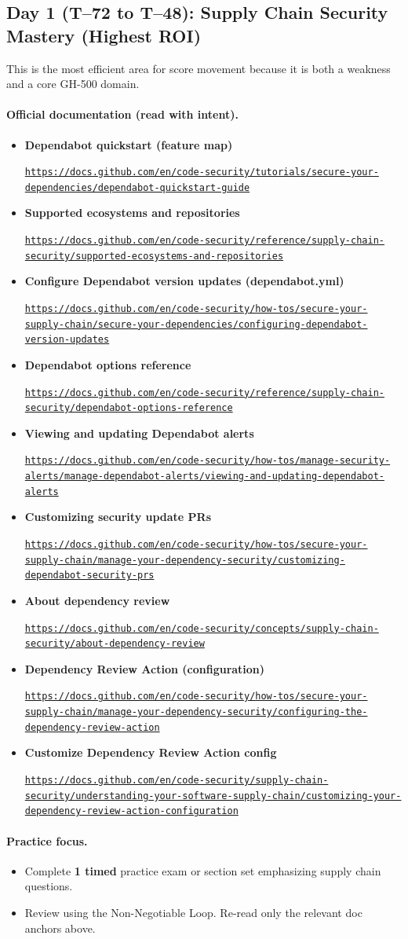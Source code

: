 \documentclass[11pt]{article}
\newcommand{\DocLink}[2]{%
  \item \textbf{#1}\par
  \noindent\href{#2}{\nolinkurl{#2}}%
}
\begin{document}
\subsection*{Day 1 (T--72 to T--48): Supply Chain Security Mastery (Highest ROI)}
This is the most efficient area for score movement because it is both a weakness and a core GH-500 domain.

\paragraph{Official documentation (read with intent).}
\begin{itemize}
  \DocLink{Dependabot quickstart (feature map)}{https://docs.github.com/en/code-security/tutorials/secure-your-dependencies/dependabot-quickstart-guide}
  \DocLink{Supported ecosystems and repositories}{https://docs.github.com/en/code-security/reference/supply-chain-security/supported-ecosystems-and-repositories}
  \DocLink{Configure Dependabot version updates (dependabot.yml)}{https://docs.github.com/en/code-security/how-tos/secure-your-supply-chain/secure-your-dependencies/configuring-dependabot-version-updates}
  \DocLink{Dependabot options reference}{https://docs.github.com/en/code-security/reference/supply-chain-security/dependabot-options-reference}
  \DocLink{Viewing and updating Dependabot alerts}{https://docs.github.com/en/code-security/how-tos/manage-security-alerts/manage-dependabot-alerts/viewing-and-updating-dependabot-alerts}
  \DocLink{Customizing security update PRs}{https://docs.github.com/en/code-security/how-tos/secure-your-supply-chain/manage-your-dependency-security/customizing-dependabot-security-prs}
  \DocLink{About dependency review}{https://docs.github.com/en/code-security/concepts/supply-chain-security/about-dependency-review}
  \DocLink{Dependency Review Action (configuration)}{https://docs.github.com/en/code-security/how-tos/secure-your-supply-chain/manage-your-dependency-security/configuring-the-dependency-review-action}
  \DocLink{Customize Dependency Review Action config}{https://docs.github.com/en/code-security/supply-chain-security/understanding-your-software-supply-chain/customizing-your-dependency-review-action-configuration}
\end{itemize}

\paragraph{Practice focus.}
\begin{itemize}
  \item Complete \textbf{1 timed} practice exam or section set emphasizing supply chain questions.
  \item Review using the Non-Negotiable Loop. Re-read only the relevant doc anchors above.
\end{itemize}
\end{document}
